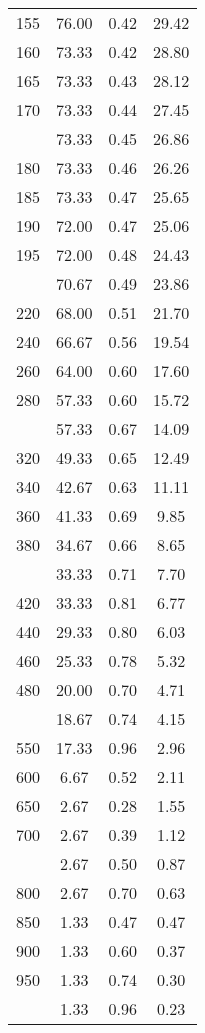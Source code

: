 \begin{table}[ht]
\begin{tabular}{lccc}
  155 & 76.00 & 0.42 & 29.42 \\ 
  160 & 73.33 & 0.42 & 28.80 \\ 
  165 & 73.33 & 0.43 & 28.12 \\ 
  170 & 73.33 & 0.44 & 27.45 \\ 
   \addlinespace
175 & 73.33 & 0.45 & 26.86 \\ 
  180 & 73.33 & 0.46 & 26.26 \\ 
  185 & 73.33 & 0.47 & 25.65 \\ 
  190 & 72.00 & 0.47 & 25.06 \\ 
  195 & 72.00 & 0.48 & 24.43 \\ 
   \addlinespace
200 & 70.67 & 0.49 & 23.86 \\ 
  220 & 68.00 & 0.51 & 21.70 \\ 
  240 & 66.67 & 0.56 & 19.54 \\ 
  260 & 64.00 & 0.60 & 17.60 \\ 
  280 & 57.33 & 0.60 & 15.72 \\ 
   \addlinespace
300 & 57.33 & 0.67 & 14.09 \\ 
  320 & 49.33 & 0.65 & 12.49 \\ 
  340 & 42.67 & 0.63 & 11.11 \\ 
  360 & 41.33 & 0.69 & 9.85 \\ 
  380 & 34.67 & 0.66 & 8.65 \\ 
   \addlinespace
400 & 33.33 & 0.71 & 7.70 \\ 
  420 & 33.33 & 0.81 & 6.77 \\ 
  440 & 29.33 & 0.80 & 6.03 \\ 
  460 & 25.33 & 0.78 & 5.32 \\ 
  480 & 20.00 & 0.70 & 4.71 \\ 
   \addlinespace
500 & 18.67 & 0.74 & 4.15 \\ 
  550 & 17.33 & 0.96 & 2.96 \\ 
  600 & 6.67 & 0.52 & 2.11 \\ 
  650 & 2.67 & 0.28 & 1.55 \\ 
  700 & 2.67 & 0.39 & 1.12 \\ 
   \addlinespace
750 & 2.67 & 0.50 & 0.87 \\ 
  800 & 2.67 & 0.70 & 0.63 \\ 
  850 & 1.33 & 0.47 & 0.47 \\ 
  900 & 1.33 & 0.60 & 0.37 \\ 
  950 & 1.33 & 0.74 & 0.30 \\ 
   \addlinespace
1000 & 1.33 & 0.96 & 0.23 \\ 
   \bottomrule
\end{tabular}
\end{table}
